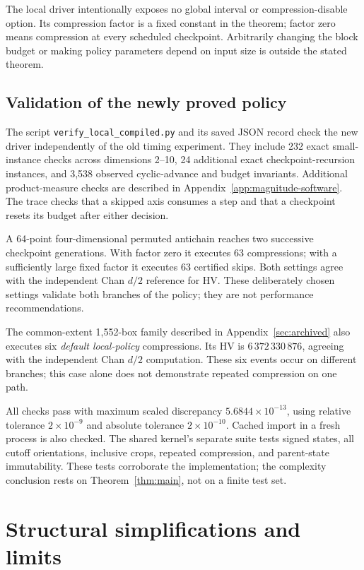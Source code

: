 \documentclass[12pt,a4paper]{article}
\theoremstyle{definition}
\begin{document}
The local driver intentionally exposes no global interval or
compression-disable option. Its compression factor is a fixed constant
in the theorem; factor zero means compression at every scheduled
checkpoint. Arbitrarily changing the block budget or making policy
parameters depend on input size is outside the stated theorem.

\subsection{Validation of the newly proved policy}
The script \texttt{verify\_local\_compiled.py} and its saved JSON record
check the new driver independently of the old timing experiment. They
include 232 exact small-instance checks across dimensions 2--10, 24
additional exact checkpoint-recursion instances, and 3,538 observed
cyclic-advance and budget invariants. Additional product-measure checks
are described in Appendix~\ref{app:magnitude-software}. The trace checks that a skipped axis consumes a step and that
a checkpoint resets its budget after either decision.

A 64-point four-dimensional permuted antichain reaches two successive
checkpoint generations. With factor zero it executes 63 compressions;
with a sufficiently large fixed factor it executes 63 certified skips.
Both settings agree with the independent Chan $d/2$ reference for HV. These deliberately chosen settings validate both branches of
the policy; they are not performance recommendations.

The common-extent 1,552-box family described in
Appendix~\ref{sec:archived} also executes six \emph{default local-policy}
compressions. Its HV is $6\,372\,330\,876$, agreeing with the independent
Chan $d/2$ computation. These six events occur on different branches; this
case alone does not demonstrate repeated compression on one path.

All checks pass with maximum scaled discrepancy
$5.6844\times10^{-13}$, using relative tolerance $2\times10^{-9}$ and
absolute tolerance $2\times10^{-10}$. Cached import in a fresh process
is also checked. The shared kernel's separate suite tests signed states,
all cutoff orientations, inclusive crops, repeated
compression, and parent-state immutability. These tests corroborate the
implementation; the complexity conclusion rests on
Theorem~\ref{thm:main}, not on a finite test set.



\section{Structural simplifications and limits}
\label{sec:discussion}
\end{document}

